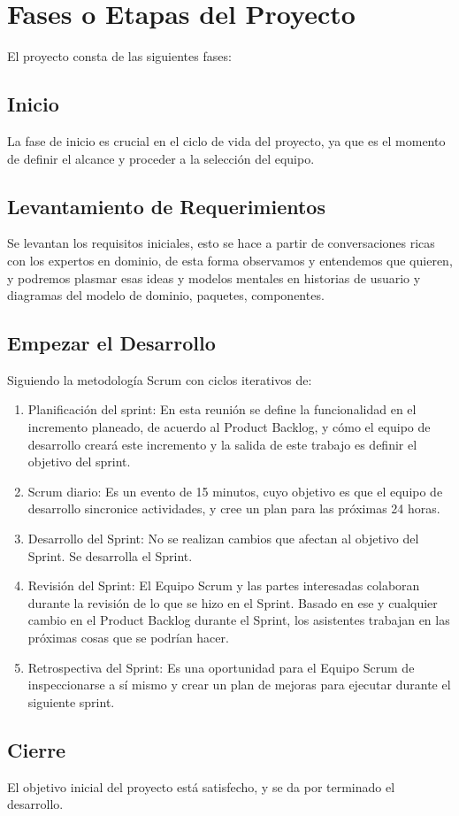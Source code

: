 \documentclass{article}
\begin{document}
\newpage
\section{Fases o Etapas del Proyecto}
El proyecto consta de las siguientes fases:

\subsection{Inicio}
La fase de inicio es crucial en el ciclo de vida del proyecto, ya que es el momento de definir el alcance y proceder a la selección del equipo.

\subsection{Levantamiento de Requerimientos}
Se levantan los requisitos iniciales, esto se hace a partir de conversaciones ricas con los expertos en dominio, de esta forma observamos y entendemos que quieren, y podremos plasmar esas ideas y modelos mentales en historias de usuario y diagramas del modelo de dominio, paquetes, componentes.

\subsection{Empezar el Desarrollo}
Siguiendo la metodología Scrum con ciclos iterativos de:
\begin{enumerate}
    \item Planificación del sprint: En esta reunión se define la funcionalidad en el incremento planeado, de acuerdo al Product Backlog, y cómo el equipo de desarrollo creará este incremento y la salida de este trabajo es definir el objetivo del sprint.
    \item Scrum diario: Es un evento de 15 minutos, cuyo objetivo es que el equipo de desarrollo sincronice actividades, y cree un plan para las próximas 24 horas.
    \item Desarrollo del Sprint: No se realizan cambios que afectan al objetivo del Sprint. Se desarrolla el Sprint.
    \item Revisión del Sprint: El Equipo Scrum y las partes interesadas colaboran durante la revisión de lo que se hizo en el Sprint. Basado en ese y cualquier cambio en el Product Backlog durante el Sprint, los asistentes trabajan en las próximas cosas que se podrían hacer.
    \item Retrospectiva del Sprint: Es una oportunidad para el Equipo Scrum de inspeccionarse a sí mismo y crear un plan de mejoras para ejecutar durante el siguiente sprint.
\end{enumerate}

\subsection{Cierre}
El objetivo inicial del proyecto está satisfecho, y se da por terminado el desarrollo.
\end{document}
